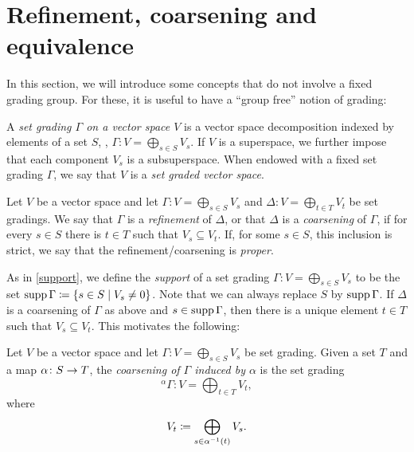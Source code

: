 
\section{Refinement, coarsening and equivalence}\label{ssec:universal_group}

In this section, we will introduce some concepts that do not involve a fixed grading group. 
For these, it is useful to have a ``group free'' notion of grading:

\begin{defi}\label{defi:set-grading}
    A \emph{set grading $\Gamma$ on a vector space $V$} is a vector space decomposition indexed by elements of a set $S$, \ie, 
    $\Gamma : V = \bigoplus_{s\in S} V_s$. 
    If $V$ is a superspace, we further impose that each component $V_s$ is a subsuperspace. 
    When endowed with a fixed set grading $\Gamma$, we say that $V$ is a \emph{set graded vector space}. 
\end{defi}

\begin{defi}\label{defi:ref-coars}
    Let $V$ be a vector space and let $\Gamma : V = \bigoplus_{s\in S} V_s$ and $\Delta : V = \bigoplus_{t \in T} V_{t}$ be set gradings. 
    We say that $\Gamma$ is a \emph{refinement} of $\Delta$, or that $\Delta$ is a \emph{coarsening} of $\Gamma$, if for every $s \in S$ there is $t \in T$ such that $V_s \subseteq V_t$. 
    If, for some $s \in S$, this inclusion is strict, we say that the refinement/coarsening is \emph{proper}. 
\end{defi}


As in \cref{support}, we define the \emph{support} of a set grading $\Gamma : V = \bigoplus_{s\in S} V_s$ to be the set $\operatorname{supp} \Gamma \coloneqq \{ s \in S \mid V_s \neq 0 \}$. 
Note that we can always replace $S$ by $\operatorname{supp} \Gamma$. 
If $\Delta$ is a coarsening of $\Gamma$ as above and $s\in \operatorname{supp} \Gamma$, then there is a unique element $t \in T$ such that $V_s \subseteq V_t$. 
This motivates the following:

\begin{defi}\label{coars-induced}
    Let $V$ be a vector space and let $\Gamma : V = \bigoplus_{s\in S} V_s$ be set grading. 
    Given a set $T$ and a map $\alpha\colon S \to T$, the \emph{coarsening of $\Gamma$ induced by $\alpha$} is the set grading 
    \[
        {}^{\alpha}\Gamma : V = \bigoplus_{t\in T} V_t,
    \]
    where 
    \[
        V_t \coloneqq \bigoplus_{s \in \alpha^{-1} (t)} V_s.
    \]
\end{defi}

